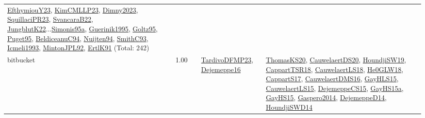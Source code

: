 {\begin{longtable}{p{3cm}r>{\raggedright\arraybackslash}p{6cm}>{\raggedright\arraybackslash}p{6cm}>{\raggedright\arraybackslash}p{8cm}}
\hyperref[detail:EfthymiouY23]{EfthymiouY23}, \hyperref[detail:KimCMLLP23]{KimCMLLP23}, \hyperref[detail:Dimny2023]{Dimny2023}, \hyperref[detail:SquillaciPR23]{SquillaciPR23}, \hyperref[detail:SvancaraB22]{SvancaraB22}, \hyperref[detail:JungblutK22]{JungblutK22}...\hyperref[detail:Simonis95a]{Simonis95a}, \hyperref[detail:Guerinik1995]{Guerinik1995}, \hyperref[detail:Goltz95]{Goltz95}, \hyperref[detail:Puget95]{Puget95}, \hyperref[detail:BeldiceanuC94]{BeldiceanuC94}, \hyperref[detail:Nuijten94]{Nuijten94}, \hyperref[detail:SmithC93]{SmithC93}, \hyperref[detail:Icmeli1993]{Icmeli1993}, \hyperref[detail:MintonJPL92]{MintonJPL92}, \hyperref[detail:ErtlK91]{ErtlK91} (Total: 242)\\
\index{bitbucket}\index{Benchmarks!bitbucket}bitbucket &  1.00 &  & \hyperref[detail:TardivoDFMP23]{TardivoDFMP23}, \hyperref[detail:Dejemeppe16]{Dejemeppe16} & \hyperref[detail:ThomasKS20]{ThomasKS20}, \hyperref[detail:CauwelaertDS20]{CauwelaertDS20}, \hyperref[detail:HoundjiSW19]{HoundjiSW19}, \hyperref[detail:CappartTSR18]{CappartTSR18}, \hyperref[detail:CauwelaertLS18]{CauwelaertLS18}, \hyperref[detail:He0GLW18]{He0GLW18}, \hyperref[detail:CappartS17]{CappartS17}, \hyperref[detail:CauwelaertDMS16]{CauwelaertDMS16}, \hyperref[detail:GayHLS15]{GayHLS15}, \hyperref[detail:CauwelaertLS15]{CauwelaertLS15}, \hyperref[detail:DejemeppeCS15]{DejemeppeCS15}, \hyperref[detail:GayHS15a]{GayHS15a}, \hyperref[detail:GayHS15]{GayHS15}, \hyperref[detail:Gaspero2014]{Gaspero2014}, \hyperref[detail:DejemeppeD14]{DejemeppeD14}, \hyperref[detail:HoundjiSWD14]{HoundjiSWD14}\\

\end{longtable}}
